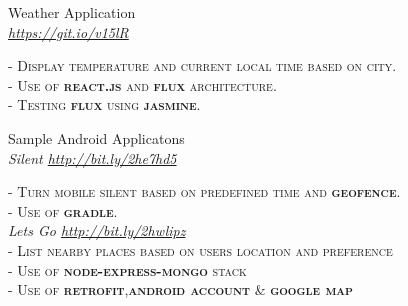 \documentclass[10pt]{article} %
\begin{document}
{\begin{minipage}[t]{0.5\textwidth}

%




{\raggedright\large Weather Application \\
	\textit{\href {https://github.com/Bitaron/js/tree/weather}{https://git.io/v15lR}}\\[5pt]}
\textsc{- Display temperature and current local time based on city.}\\
\textsc{- Use of \textbf{react.js} and \textbf{flux} architecture.}\\
\textsc{- Testing \textbf{flux} using \textbf{jasmine}.}\\




{\raggedright\large Sample Android Applicatons \\
	\textit{Silent \href {https://dl.dropboxusercontent.com/u/84146203/projects/android/silent.apk}{http://bit.ly/2he7hd5}}\\[5pt]}
	\textsc{- Turn mobile silent based on predefined time and \textbf{geofence}.}\\
\textsc{- Use of \textbf{gradle}.}\\
		\textit{Lets Go \href {https://dl.dropboxusercontent.com/u/84146203/projects/android/letsgo.apk}{http://bit.ly/2hwlipz}}\\[5pt]
		\textsc{- List nearby places based on users location and preference}\\
\textsc{- Use of \textbf{node-express-mongo} stack}\\
\textsc{- Use of \textbf{retrofit},\textbf{android account} \& \textbf{google map}}\\




\end{minipage}}
\end{document}
